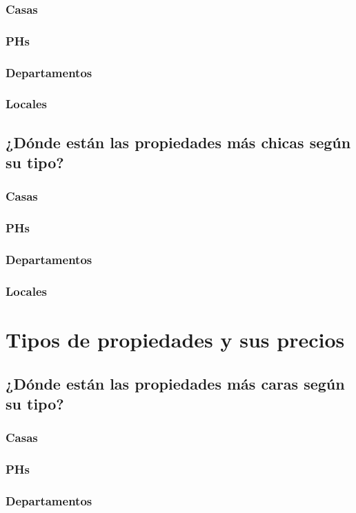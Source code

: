 \documentclass[a4paper, 10pt]{article}
\begin{document}
				\subsubsection{Casas}
				\subsubsection{PHs}
				\subsubsection{Departamentos}
				\subsubsection{Locales}
			\subsection{¿Dónde están las propiedades más chicas según su tipo?}
				\subsubsection{Casas}
				\subsubsection{PHs}
				\subsubsection{Departamentos}
				\subsubsection{Locales}
		\section{Tipos de propiedades y sus precios}
			\subsection{¿Dónde están las propiedades más caras según su tipo?}
				\subsubsection{Casas}
				\subsubsection{PHs}
				\subsubsection{Departamentos}
\end{document}
